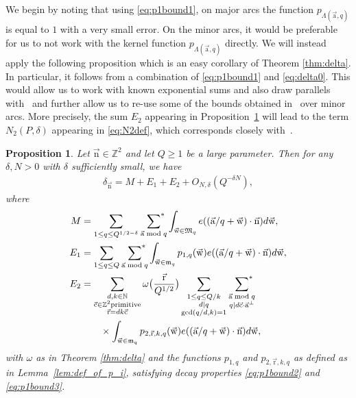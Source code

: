 \documentclass[letterpaper,11pt]{amsart}
\numberwithin{equation}{section}
\newtheorem{proposition}[theorem]{Proposition}
\theoremstyle{definition}
\numberwithin{equation}{section}
\newcommand{\ZZ}{\mathbb{Z}}
\newcommand{\NN}{\mathbb{N}}
\renewcommand{\d}{\mathbf{d}}
\newcommand{\starsum}{\sideset{}{^*}\sum}
\newcommand{\ua}{\vec{\mathrm{a}}}
\newcommand{\ur}{\vec{\mathrm{r}}}
\newcommand{\uw}{{\vec{\mathrm{w}}}}
\newcommand{\uc}{{\vec{\mathrm{c}}}}
\newcommand{\nn}{\vec{\mathrm{n}}}
\begin{document}
We begin by noting that using \eqref{eq:p1bound1}, on major arcs the function \(p_{\Lambda(\ua,q)}\) is equal to $1$ with a very small error. On the minor arcs, it would be preferable for us to not work with the kernel function \(p_{\Lambda(\ua,q)}\) directly. We will instead apply the following proposition which is an easy corollary of Theorem \ref{thm:delta}. In particular, it follows from a combination of \eqref{eq:p1bound1} and \eqref{eq:delta0}. This would allow us to work with known exponential sums and also draw parallels with~\cite[Theorem 1.1]{V19} and further allow us to re-use some of the bounds obtained in~\cite{V19} over minor arcs. More precisely, the sum $E_2$ appearing in Proposition~\ref{prop:delta2} will lead to the term $N_2(P,\delta)$ appearing in \eqref{eq:N2def}, which corresponds closely with~\cite[Lemma 5.1]{V19}.  
\begin{proposition}\label{prop:delta2}
	Let $\nn \in \mathbb Z^2 $ and let $Q\geq 1$ be a large parameter. 	Then for any $\delta, N>0$ with \(\delta\) sufficiently small, we have
	\begin{align*}
	\delta_{\nn}=M+E_1+E_2+O_{N, \delta}(Q^{-\delta N}),
	\end{align*}
where 
	\begin{equation*}
    \begin{split}
	M&=\sum_{1\leq q\leq Q^{1/2-\delta}}\,\,\starsum_{\ua \bmod q}\int_{\uw\in \mathfrak M_q }e((\ua/q+\uw)\cdot \nn)d\uw,\\
	E_1&=\sum_{1\leq q\leq Q}\,\,\starsum_{\ua \bmod q}\int_{\uw\in \mathfrak m_q}p_{1,q}(\uw)e((\ua/q+\uw)\cdot \nn)d\uw,\\
	E_2&=\sum_{\substack{d,k\in \NN\\ \uc \in \ZZ^2 \mathrm{ primitive }\\ \ur=dk\uc}}\omega\big(\frac{\ur}{Q^{1/2}}\big)\sum_{\substack{1\leq q\leq Q/k\\d\mid q\\ \gcd(q/d, k)=1}}\,\,\starsum_{\substack{\ua \bmod q\\q\mid d\uc \cdot\ua^\perp}}\\
    & \quad \quad  \times \int_{\uw \in \mathfrak m_q }p_{2,\ur,k,q}(\uw)e((\ua/q+\uw)\cdot \nn)d\uw,
    \end{split}
	\end{equation*}
with $\omega$ as in Theorem \ref{thm:delta} and the functions $p_{1, q}$ and $p_{2,\ur,k,q}$ as defined as in Lemma~\ref{lem:def_of_p_i}, satisfying decay properties \eqref{eq:p1bound2} and \eqref{eq:p1bound3}.
\end{proposition}  
\end{document}
